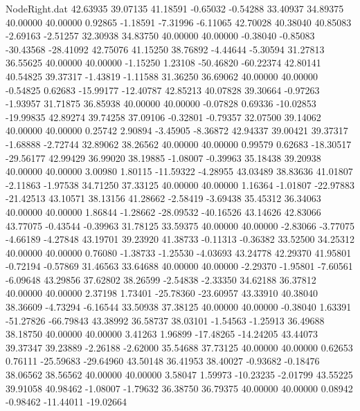 \begin{filecontents}{NodeRight.dat}
  42.63935   39.07135   41.18591    -0.65032   -0.54288   33.40937   34.89375   40.00000   40.00000    0.92865   -1.18591   -7.31996   -6.11065
  42.70028   40.38040   40.85083    -2.69163   -2.51257   32.30938   34.83750   40.00000   40.00000   -0.38040   -0.85083  -30.43568  -28.41092
  42.75076   41.15250   38.76892    -4.44644   -5.30594   31.27813   36.55625   40.00000   40.00000   -1.15250    1.23108  -50.46820  -60.22374
  42.80141   40.54825   39.37317    -1.43819   -1.11588   31.36250   36.69062   40.00000   40.00000   -0.54825    0.62683  -15.99177  -12.40787
  42.85213   40.07828   39.30664    -0.97263   -1.93957   31.71875   36.85938   40.00000   40.00000   -0.07828    0.69336  -10.02853  -19.99835
  42.89274   39.74258   37.09106    -0.32801   -0.79357   32.07500   39.14062   40.00000   40.00000    0.25742    2.90894   -3.45905   -8.36872
  42.94337   39.00421   39.37317    -1.68888   -2.72744   32.89062   38.26562   40.00000   40.00000    0.99579    0.62683  -18.30517  -29.56177
  42.99429   36.99020   38.19885    -1.08007   -0.39963   35.18438   39.20938   40.00000   40.00000    3.00980    1.80115  -11.59322   -4.28955
  43.03489   38.83636   41.01807    -2.11863   -1.97538   34.71250   37.33125   40.00000   40.00000    1.16364   -1.01807  -22.97883  -21.42513
  43.10571   38.13156   41.28662    -2.58419   -3.69438   35.45312   36.34063   40.00000   40.00000    1.86844   -1.28662  -28.09532  -40.16526
  43.14626   42.83066   43.77075    -0.43544   -0.39963   31.78125   33.59375   40.00000   40.00000   -2.83066   -3.77075   -4.66189   -4.27848
  43.19701   39.23920   41.38733    -0.11313   -0.36382   33.52500   34.25312   40.00000   40.00000    0.76080   -1.38733   -1.25530   -4.03693
  43.24778   42.29370   41.95801    -0.72194   -0.57869   31.46563   33.64688   40.00000   40.00000   -2.29370   -1.95801   -7.60561   -6.09648
  43.29856   37.62802   38.26599    -2.54838   -2.33350   34.62188   36.37812   40.00000   40.00000    2.37198    1.73401  -25.78360  -23.60957
  43.33910   40.38040   38.36609    -4.73294   -6.16544   33.50938   37.38125   40.00000   40.00000   -0.38040    1.63391  -51.27826  -66.79843
  43.38992   36.58737   38.03101    -1.54563   -1.25913   36.49688   38.18750   40.00000   40.00000    3.41263    1.96899  -17.48265  -14.24205
  43.44073   39.37347   39.23889    -2.26188   -2.62000   35.54688   37.73125   40.00000   40.00000    0.62653    0.76111  -25.59683  -29.64960
  43.50148   36.41953   38.40027    -0.93682   -0.18476   38.06562   38.56562   40.00000   40.00000    3.58047    1.59973  -10.23235   -2.01799
  43.55225   39.91058   40.98462    -1.08007   -1.79632   36.38750   36.79375   40.00000   40.00000    0.08942   -0.98462  -11.44011  -19.02664

\end{filecontents}
